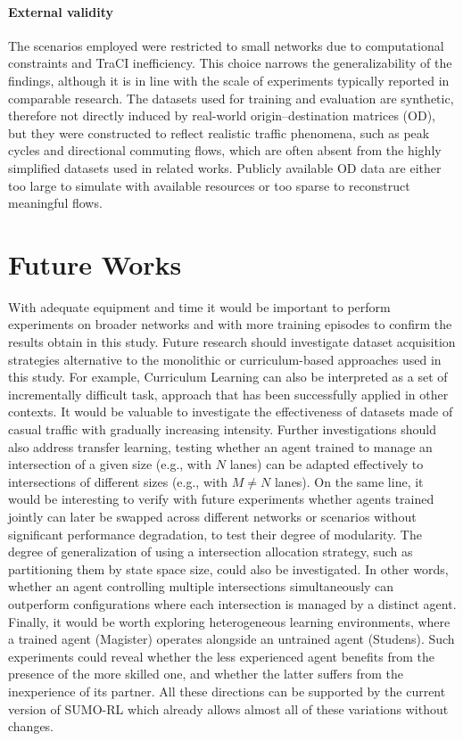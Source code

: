 \paragraph{External validity}

The scenarios employed were restricted to small networks due to computational constraints and TraCI inefficiency.
This choice narrows the generalizability of the findings, although it is in line with the scale of experiments typically reported in comparable research.
The datasets used for training and evaluation are synthetic, therefore not directly induced by real-world origin–destination matrices (OD), but they were constructed to reflect realistic traffic phenomena, such as peak cycles and directional commuting flows, which are often absent from the highly simplified datasets used in related works.
Publicly available OD data are either too large to simulate with available resources or too sparse to reconstruct meaningful flows.

\section{Future Works}

With adequate equipment and time it would be important to perform experiments on broader networks and with more training episodes to confirm the results obtain in this study.
Future research should investigate dataset acquisition strategies alternative to the monolithic or curriculum-based approaches used in this study.
For example, Curriculum Learning can also be interpreted as a set of incrementally difficult task, approach that has been successfully applied in other contexts.
It would be valuable to investigate the effectiveness of datasets made of casual traffic with gradually increasing intensity.
Further investigations should also address transfer learning, testing whether an agent trained to manage an intersection of a given size (e.g., with $N$ lanes) can be adapted effectively to intersections of different sizes (e.g., with $M \ne N$ lanes).
On the same line, it would be interesting to verify with future experiments whether agents trained jointly can later be swapped across different networks or scenarios without significant performance degradation, to test their degree of modularity.
The degree of generalization of using a intersection allocation strategy, such as partitioning them by state space size, could also be investigated.
In other words, whether an agent controlling multiple intersections simultaneously can outperform configurations where each intersection is managed by a distinct agent.
Finally, it would be worth exploring heterogeneous learning environments, where a trained agent (Magister) operates alongside an untrained agent (Studens).
Such experiments could reveal whether the less experienced agent benefits from the presence of the more skilled one, and whether the latter suffers from the inexperience of its partner.
All these directions can be supported by the current version of SUMO-RL which already allows almost all of these variations without changes.
